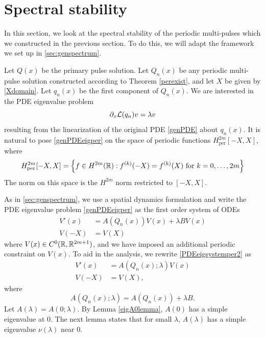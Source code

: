 \documentclass[11pt,reqno]{amsart}
\theoremstyle{plain}
\theoremstyle{definition}
\theoremstyle{remark}
\begin{document}
\section{Spectral stability}\label{sec:perstab}

In this section, we look at the spectral stability of the periodic multi-pulses which we constructed in the previous section. To do this, we will adapt the framework we set up in \cref{sec:genspectrum}.

Let $Q(x)$ be the primary pulse solution. Let $Q_n(x)$ be any periodic multi-pulse solution constructed according to Theorem \ref{perexist}, and let $X$ be given by \cref{Xdomain}. Let $q_n(x)$ be the first component of $Q_n(x)$. We are interested in the PDE eigenvalue problem
\begin{equation}\label{genPDEeigper}
\partial_x \mathcal{L}(q_n) v = \lambda v
\end{equation}
resulting from the linearization of the original PDE \cref{genPDE} about $q_n(x)$. It is natural to pose \cref{genPDEeigper} on the space of periodic functions $H^{2m}_{\text{per}}[-X,X]$, where
\[
H^{2m}_{\text{per}}[-X,X] = \left\{ f \in H^{2m}(\mathbb{R}) : f^{(k)}(-X) = f^{(k)}(X) \text{ for } k = 0, \dots, 2m \right\} 
\]
The norm on this space is the $H^{2m}$ norm restricted to $[-X, X]$. 

As in \cref{sec:genspectrum}, we use a spatial dynamics formulation and write the PDE eigenvalue problem \cref{genPDEeigper} as the first order system of ODEs
\begin{equation}\label{PDEeigsystemper2}
\begin{aligned}
V'(x) &= A(Q_n(x))V(x) + \lambda B V(x) \\
V(-X) &= V(X)
\end{aligned}
\end{equation}
where $V(x) \in C^0(\mathbb{R},\mathbb{R}^{2m+1})$, and we have imposed an additional periodic constraint on $V(x)$. To aid in the analysis, we rewrite \cref{PDEeigsystemper2} as
\begin{equation}\label{PDEeigsystemper3}
\begin{aligned}
V'(x) &= A(Q_n(x); \lambda)V(x) \\
V(-X) &= V(X),
\end{aligned}
\end{equation}
where 
\begin{equation}\label{AQnlambda}
A(Q_n(x); \lambda) = A(Q_n(x)) + \lambda B.
\end{equation}
Let $A(\lambda) = A(0; \lambda)$. By Lemma \ref{eigA0lemma}, $A(0)$ has a simple eigenvalue at 0. The next lemma states that for small $\lambda$, $A(\lambda)$ has a simple eigenvalue $\nu(\lambda)$ near 0.
\end{document}
